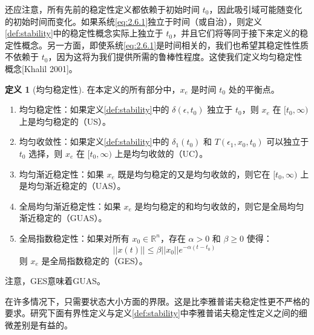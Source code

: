 \documentclass[UTF8,12pt,a4paper]{ctexart}
\theoremstyle{definition}
\newtheorem{definition}{定义}[section]
\begin{document}
还应注意，所有先前的稳定性定义都依赖于初始时间 $t_0$，因此吸引域可能随变化的初始时间而变化。如果系统\eqref{eq:2.6.1}独立于时间（或自治），则定义\ref{def:stability}中的稳定性概念实际上独立于 $t_0$，并且它们将等同于接下来定义的稳定性概念。另一方面，即使系统\eqref{eq:2.6.1}是时间相关的，我们也希望其稳定性性质不依赖于 $t_0$，因为这将为我们提供所需的鲁棒性程度。这使我们定义均匀稳定性概念[Khalil 2001]。

\begin{definition}[均匀稳定性]
在本定义的所有部分中，$x_e$ 是时间 $t_0$ 处的平衡点。
\begin{enumerate}
\item 均匀稳定性：如果定义\ref{def:stability}中的 $\delta(\epsilon, t_0)$ 独立于 $t_0$，则 $x_e$ 在 $[t_0, \infty)$ 上是均匀稳定的（US）。

\item 均匀收敛性：如果定义\ref{def:stability}中的 $\delta_1(t_0)$ 和 $T(\epsilon_1, x_0, t_0)$ 可以独立于 $t_0$ 选择，则 $x_e$ 在 $[t_0, \infty)$ 上是均匀收敛的（UC）。

\item 均匀渐近稳定性：如果 $x_e$ 既是均匀稳定的又是均匀收敛的，则它在 $[t_0, \infty)$ 上是均匀渐近稳定的（UAS）。

\item 全局均匀渐近稳定性：如果 $x_e$ 是均匀稳定的和均匀收敛的，则它是全局均匀渐近稳定的（GUAS）。

\item 全局指数稳定性：如果对所有 $x_0 \in \mathbb{R}^n$，存在 $\alpha > 0$ 和 $\beta \geq 0$ 使得：
\[
||x(t)|| \leq \beta ||x_0|| e^{-\alpha(t-t_0)}
\]
则 $x_e$ 是全局指数稳定的（GES）。
\end{enumerate}
\end{definition}

注意，GES意味着GUAS。

在许多情况下，只需要状态大小方面的界限。这是比李雅普诺夫稳定性更不严格的要求。研究下面有界性定义与定义\ref{def:stability}中李雅普诺夫稳定性定义之间的细微差别是有益的。
\end{document}
